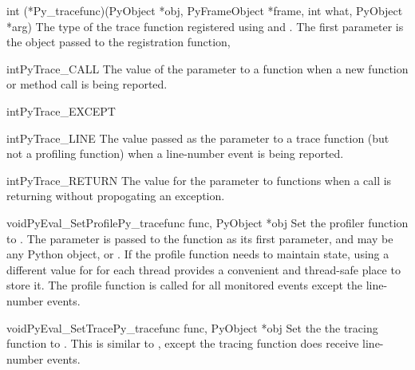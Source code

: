 \documentclass{manual}
\begin{document}
\begin{ctypedesc}[Py_tracefunc]{int (*Py_tracefunc)(PyObject *obj,
                                PyFrameObject *frame, int what,
                                PyObject *arg)}
  The type of the trace function registered using
   and .
  The first parameter is the object passed to the registration
  function, 
\end{ctypedesc}

\begin{cvardesc}{int}{PyTrace_CALL}
  The value of the  parameter to a 
  function when a new function or method call is being reported.
\end{cvardesc}

\begin{cvardesc}{int}{PyTrace_EXCEPT}
\end{cvardesc}

\begin{cvardesc}{int}{PyTrace_LINE}
  The value passed as the  parameter to a trace function
  (but not a profiling function) when a line-number event is being
  reported.
\end{cvardesc}

\begin{cvardesc}{int}{PyTrace_RETURN}
  The value for the  parameter to 
  functions when a call is returning without propogating an exception.
\end{cvardesc}

\begin{cfuncdesc}{void}{PyEval_SetProfile}{Py_tracefunc func, PyObject *obj}
  Set the profiler function to .  The  parameter is
  passed to the function as its first parameter, and may be any Python
  object, or \NULL.  If the profile function needs to maintain state,
  using a different value for  for each thread provides a
  convenient and thread-safe place to store it.  The profile function
  is called for all monitored events except the line-number events.
\end{cfuncdesc}

\begin{cfuncdesc}{void}{PyEval_SetTrace}{Py_tracefunc func, PyObject *obj}
  Set the the tracing function to .  This is similar to
  , except the tracing function does
  receive line-number events.
\end{cfuncdesc}
\end{document}
